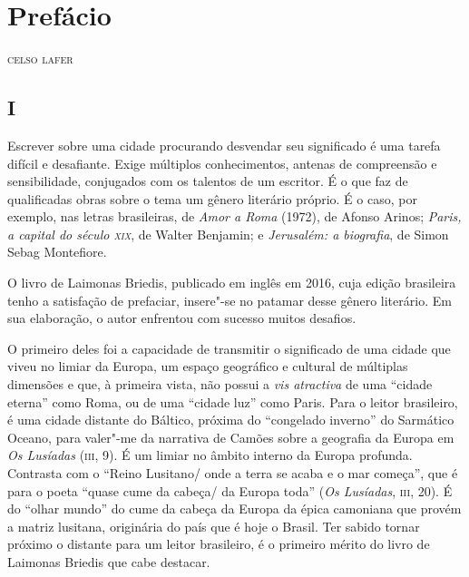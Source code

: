 \chapter[Prefácio, \textit{por Celso Lafer}]{Prefácio }

\begin{flushright}
\textsc{celso lafer}
\end{flushright}

\section*{I}

\noindent{}Escrever sobre uma cidade procurando desvendar seu significado é uma
tarefa difícil e desafiante. Exige múltiplos conhecimentos, antenas de
compreensão e sensibilidade, conjugados com os talentos de um escritor.
É o que faz de qualificadas obras sobre o tema um gênero literário
próprio. É o caso, por exemplo, nas letras brasileiras, de \textit{Amor a
Roma} (1972), de Afonso Arinos; \textit{Paris, a capital do século \textsc{xix}},
de Walter Benjamin; e \textit{Jerusalém: a biografia}, de Simon Sebag
Montefiore.

O livro de Laimonas Briedis, publicado em inglês em 2016, cuja edição
brasileira tenho a satisfação de prefaciar, insere"-se no patamar desse
gênero literário. Em sua elaboração, o autor enfrentou com sucesso
muitos desafios.

O primeiro deles foi a capacidade de transmitir o significado de uma
cidade que viveu no limiar da Europa, um espaço geográfico e cultural de
múltiplas dimensões e que, à primeira vista, não possui a \textit{vis
atractiva} de uma ``cidade eterna'' como Roma, ou de uma ``cidade luz''
como Paris. Para o leitor brasileiro, é uma cidade distante do Báltico,
próxima do ``congelado inverno'' do Sarmático Oceano, para valer"-me da
narrativa de Camões sobre a geografia da Europa em \textit{Os Lusíadas}
(\textsc{iii}, 9). É um limiar no âmbito interno da Europa profunda. Contrasta
com o ``Reino Lusitano/ onde a terra se acaba e o mar começa'', que é
para o poeta ``quase cume da cabeça/ da Europa toda'' (\textit{Os
Lusíadas}, \textsc{iii}, 20). É do ``olhar mundo'' do cume da cabeça da Europa da
épica camoniana que provém a matriz lusitana, originária do país que é
hoje o Brasil. Ter sabido tornar próximo o distante para um leitor
brasileiro, é o primeiro mérito do livro de Laimonas Briedis que cabe
destacar.

